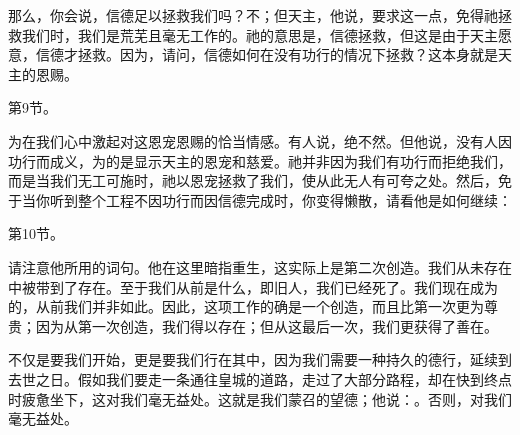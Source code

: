 那么，你会说，信德足以拯救我们吗？不；但天主，他说，要求这一点，免得祂拯救我们时，我们是荒芜且毫无工作的。祂的意思是，信德拯救，但这是由于天主愿意，信德才拯救。因为，请问，信德如何在没有功行的情况下拯救？这本身就是天主的恩赐。\par

第9节。\par

为在我们心中激起对这恩宠恩赐的恰当情感。有人说，绝不然。但他说，没有人因功行而成义，为的是显示天主的恩宠和慈爱。祂并非因为我们有功行而拒绝我们，而是当我们无工可施时，祂以恩宠拯救了我们，使从此无人有可夸之处。然后，免于当你听到整个工程不因功行而因信德完成时，你变得懒散，请看他是如何继续：\par

第10节。\par

请注意他所用的词句。他在这里暗指重生，这实际上是第二次创造。我们从未存在中被带到了存在。至于我们从前是什么，即旧人，我们已经死了。我们现在成为的，从前我们并非如此。因此，这项工作的确是一个创造，而且比第一次更为尊贵；因为从第一次创造，我们得以存在；但从这最后一次，我们更获得了善在。\par

\par

不仅是要我们开始，更是要我们行在其中，因为我们需要一种持久的德行，延续到去世之日。假如我们要走一条通往皇城的道路，走过了大部分路程，却在快到终点时疲惫坐下，这对我们毫无益处。这就是我们蒙召的望德；他说：。否则，对我们毫无益处。\par

